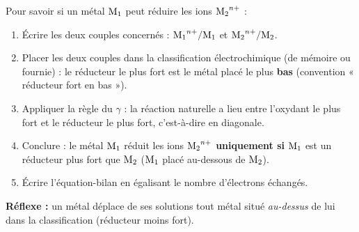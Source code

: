 \documentclass[11pt]{article}
\newcommand{\cle}[1]{{\popxbold\color{popdark}#1}}
\begin{document}
\begin{methode}
Pour savoir si un métal $\ce{M_1}$ peut réduire les ions $\ce{M_2^{n+}}$ :
\begin{enumerate}
\item Écrire les deux couples concernés : $\ce{M_1^{n+}}/\ce{M_1}$ et $\ce{M_2^{n+}}/\ce{M_2}$.
\item Placer les deux couples dans la \cle{classification électrochimique} (de mémoire ou fournie) : le réducteur le plus fort est le métal placé le plus \textbf{bas} (convention « réducteur fort en bas »).
\item Appliquer la \cle{règle du $\gamma$} : la réaction naturelle a lieu entre l'oxydant le plus fort et le réducteur le plus fort, c'est-à-dire en diagonale.
\item Conclure : le métal $\ce{M_1}$ réduit les ions $\ce{M_2^{n+}}$ \textbf{uniquement si} $\ce{M_1}$ est un réducteur plus fort que $\ce{M_2}$ ($\ce{M_1}$ placé au-dessous de $\ce{M_2}$).
\item Écrire l'équation-bilan en égalisant le nombre d'électrons échangés.
\end{enumerate}
\textbf{Réflexe :} un métal déplace de ses solutions tout métal situé \emph{au-dessus} de lui dans la classification (réducteur moins fort).
\end{methode}
\end{document}
